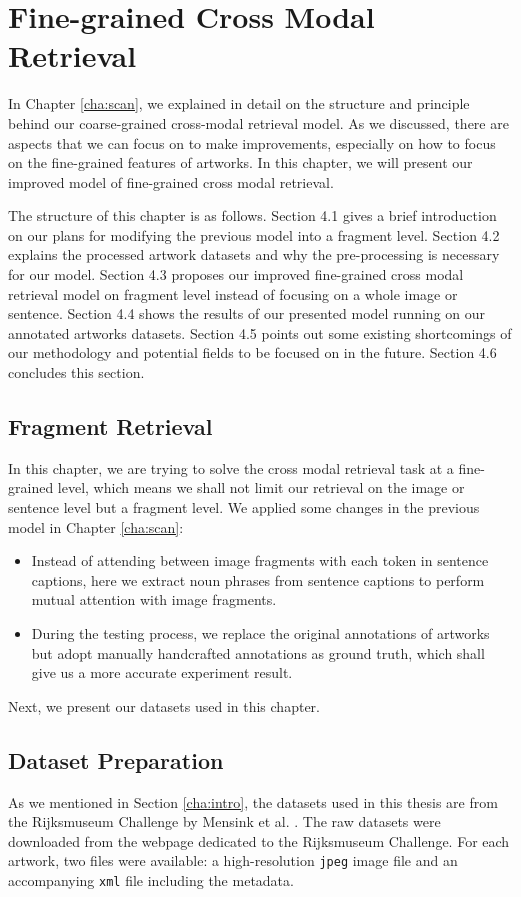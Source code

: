 \chapter{Fine-grained Cross Modal Retrieval}
\label{cha:Method}

In Chapter \ref{cha:scan}, we explained in detail on the structure and principle behind our coarse-grained cross-modal retrieval model. As we discussed, there are aspects that we can focus on to make improvements, especially on how to focus on the fine-grained features of artworks. In this chapter, we will present our improved model of fine-grained cross modal retrieval.

The structure of this chapter is as follows. Section 4.1 gives a brief introduction on our plans for modifying the previous model into a fragment level. Section 4.2 explains the processed artwork datasets and why the pre-processing is necessary for our model. Section 4.3 proposes our improved fine-grained cross modal retrieval model on fragment level instead of focusing on a whole image or sentence. Section 4.4 shows the results of our presented model running on our annotated artworks datasets. Section 4.5 points out some existing shortcomings of our methodology and potential fields to be focused on in the future. Section 4.6 concludes this section.


\section{Fragment Retrieval}
In this chapter, we are trying to solve the cross modal retrieval task at a fine-grained level, which means we shall not limit our retrieval on the image or sentence level but a fragment level. We applied some changes in the previous model in Chapter \ref{cha:scan}:

\begin{itemize}
    \item Instead of attending between image fragments with each token in sentence captions, here we extract noun phrases from sentence captions to perform mutual attention with image fragments.
    \item During the testing process, we replace the original annotations of artworks but adopt manually handcrafted annotations as ground truth, which shall give us a more accurate experiment result.
\end{itemize}

Next, we present our datasets used in this chapter.

\section{Dataset Preparation}
\label{sec:dataprep}
As we mentioned in Section \ref{cha:intro}, the datasets used in this thesis are from the Rijksmuseum Challenge by Mensink et al. \cite{MensinkICMIR2014}. The raw datasets were downloaded from the webpage dedicated to the Rijksmuseum Challenge. For each artwork, two files were available: a high-resolution \verb|jpeg| image file and an accompanying \verb|xml| file including the metadata.

